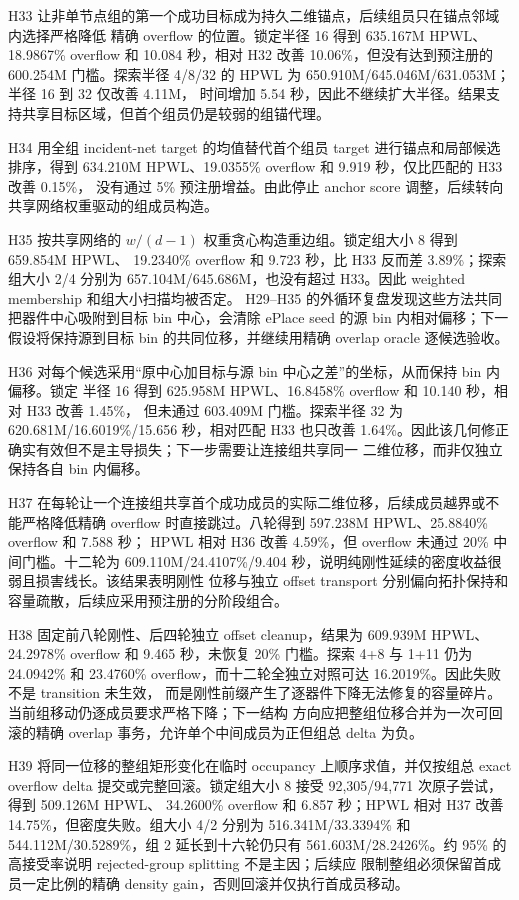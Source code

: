 \documentclass[UTF8,a4paper,11pt]{ctexart}
\begin{document}
H33 让非单节点组的第一个成功目标成为持久二维锚点，后续组员只在锚点邻域内选择严格降低
精确 overflow 的位置。锁定半径 16 得到 635.167M HPWL、18.9867\% overflow 和
10.084 秒，相对 H32 改善 10.06\%，但没有达到预注册的 600.254M 门槛。探索半径
4/8/32 的 HPWL 为 650.910M/645.046M/631.053M；半径 16 到 32 仅改善 4.11M，
时间增加 5.54 秒，因此不继续扩大半径。结果支持共享目标区域，但首个组员仍是较弱的组锚代理。

H34 用全组 incident-net target 的均值替代首个组员 target 进行锚点和局部候选排序，得到
634.210M HPWL、19.0355\% overflow 和 9.919 秒，仅比匹配的 H33 改善 0.15\%，
没有通过 5\% 预注册增益。由此停止 anchor score 调整，后续转向共享网络权重驱动的组成员构造。

H35 按共享网络的 $w/(d-1)$ 权重贪心构造重边组。锁定组大小 8 得到 659.854M HPWL、
19.2340\% overflow 和 9.723 秒，比 H33 反而差 3.89\%；探索组大小 2/4 分别为
657.104M/645.686M，也没有超过 H33。因此 weighted membership 和组大小扫描均被否定。
H29--H35 的外循环复盘发现这些方法共同把器件中心吸附到目标 bin 中心，会清除 ePlace seed
的源 bin 内相对偏移；下一假设将保持源到目标 bin 的共同位移，并继续用精确 overlap oracle
逐候选验收。

H36 对每个候选采用“原中心加目标与源 bin 中心之差”的坐标，从而保持 bin 内偏移。锁定
半径 16 得到 625.958M HPWL、16.8458\% overflow 和 10.140 秒，相对 H33 改善 1.45\%，
但未通过 603.409M 门槛。探索半径 32 为 620.681M/16.6019\%/15.656 秒，相对匹配
H33 也只改善 1.64\%。因此该几何修正确实有效但不是主导损失；下一步需要让连接组共享同一
二维位移，而非仅独立保持各自 bin 内偏移。

H37 在每轮让一个连接组共享首个成功成员的实际二维位移，后续成员越界或不能严格降低精确
overflow 时直接跳过。八轮得到 597.238M HPWL、25.8840\% overflow 和 7.588 秒；
HPWL 相对 H36 改善 4.59\%，但 overflow 未通过 20\% 中间门槛。十二轮为
609.110M/24.4107\%/9.404 秒，说明纯刚性延续的密度收益很弱且损害线长。该结果表明刚性
位移与独立 offset transport 分别偏向拓扑保持和容量疏散，后续应采用预注册的分阶段组合。

H38 固定前八轮刚性、后四轮独立 offset cleanup，结果为 609.939M HPWL、24.2978\%
overflow 和 9.465 秒，未恢复 20\% 门槛。探索 4+8 与 1+11 仍为 24.0942\% 和
23.4760\% overflow，而十二轮全独立对照可达 16.2019\%。因此失败不是 transition 未生效，
而是刚性前缀产生了逐器件下降无法修复的容量碎片。当前组移动仍逐成员要求严格下降；下一结构
方向应把整组位移合并为一次可回滚的精确 overlap 事务，允许单个中间成员为正但组总 delta 为负。

H39 将同一位移的整组矩形变化在临时 occupancy 上顺序求值，并仅按组总 exact overflow
delta 提交或完整回滚。锁定组大小 8 接受 92,305/94,771 次原子尝试，得到 509.126M HPWL、
34.2600\% overflow 和 6.857 秒；HPWL 相对 H37 改善 14.75\%，但密度失败。组大小 4/2
分别为 516.341M/33.3394\% 和 544.112M/30.5289\%，组 2 延长到十六轮仍只有
561.603M/28.2426\%。约 95\% 的高接受率说明 rejected-group splitting 不是主因；后续应
限制整组必须保留首成员一定比例的精确 density gain，否则回滚并仅执行首成员移动。
\end{document}
